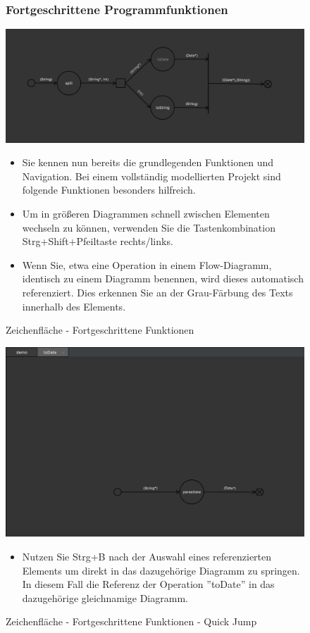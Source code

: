 \begin{figure}[h!]
\subsubsection{Fortgeschrittene Programmfunktionen}
	\centering
	\includegraphics[width=1\textwidth]{Advanced.png}
	\caption{Zeichenfläche - Fortgeschrittene Funktionen}	
\begin{itemize}	
\item Sie kennen nun bereits die grundlegenden Funktionen und Navigation. Bei einem vollständig modellierten Projekt sind folgende Funktionen besonders hilfreich. 
\item Um in größeren Diagrammen schnell zwischen Elementen wechseln zu können, verwenden Sie die Tastenkombination Strg+Shift+Pfeiltaste rechts/links. 
\item Wenn Sie, etwa eine Operation in einem Flow-Diagramm,  identisch zu einem Diagramm benennen, wird dieses automatisch referenziert. Dies erkennen Sie an der Grau-Färbung des Texts innerhalb des Elements.
\end{itemize}
\end{figure}

\begin{figure}[h!]
	\centering
	\includegraphics[width=1\textwidth]{Advanced2.png}
	\caption{Zeichenfläche - Fortgeschrittene Funktionen - Quick
	 Jump}
\begin{itemize}	
\item Nutzen Sie Strg+B nach der Auswahl eines referenzierten Elements um direkt in das dazugehörige Diagramm zu springen. In diesem Fall die Referenz der Operation ''toDate'' in das dazugehörige gleichnamige Diagramm.
\end{itemize}
\end{figure}


